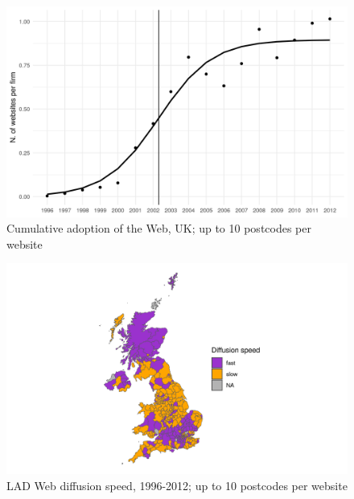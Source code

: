\documentclass[
  authoryear,
  preprint,
  3p]{elsarticle}
\begin{document}
\begin{figure}[H]

{\centering \includegraphics[width=1\textwidth,height=\textheight]{../../outputs/s/s_uk_per_firm_10.png}

}

\caption{\label{s_uk10}Cumulative adoption of the Web, UK; up to 10
postcodes per website}

\end{figure}%

\begin{figure}[H]

{\centering \includegraphics[width=1\textwidth,height=\textheight]{../../outputs/s/speed_map_10.png}

}

\caption{\label{s_map10}LAD Web diffusion speed, 1996-2012; up to 10
postcodes per website}

\end{figure}%
\end{document}
